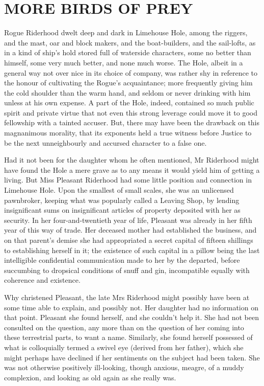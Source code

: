 
\chapter{MORE BIRDS OF PREY}

Rogue Riderhood dwelt deep and dark in Limehouse Hole, among the
riggers, and the mast, oar and block makers, and the boat-builders, and
the sail-lofts, as in a kind of ship’s hold stored full of waterside
characters, some no better than himself, some very much better, and
none much worse. The Hole, albeit in a general way not over nice in
its choice of company, was rather shy in reference to the honour of
cultivating the Rogue’s acquaintance; more frequently giving him the
cold shoulder than the warm hand, and seldom or never drinking with him
unless at his own expense. A part of the Hole, indeed, contained so
much public spirit and private virtue that not even this strong leverage
could move it to good fellowship with a tainted accuser. But, there may
have been the drawback on this magnanimous morality, that its exponents
held a true witness before Justice to be the next unneighbourly and
accursed character to a false one.

Had it not been for the daughter whom he often mentioned, Mr Riderhood
might have found the Hole a mere grave as to any means it would yield
him of getting a living. But Miss Pleasant Riderhood had some little
position and connection in Limehouse Hole. Upon the smallest of small
scales, she was an unlicensed pawnbroker, keeping what was popularly
called a Leaving Shop, by lending insignificant sums on insignificant
articles of property deposited with her as security. In her
four-and-twentieth year of life, Pleasant was already in her fifth year
of this way of trade. Her deceased mother had established the business,
and on that parent’s demise she had appropriated a secret capital of
fifteen shillings to establishing herself in it; the existence of
such capital in a pillow being the last intelligible confidential
communication made to her by the departed, before succumbing to
dropsical conditions of snuff and gin, incompatible equally with
coherence and existence.

Why christened Pleasant, the late Mrs Riderhood might possibly have
been at some time able to explain, and possibly not. Her daughter had no
information on that point. Pleasant she found herself, and she couldn’t
help it. She had not been consulted on the question, any more than on
the question of her coming into these terrestrial parts, to want a name.
Similarly, she found herself possessed of what is colloquially termed
a swivel eye (derived from her father), which she might perhaps have
declined if her sentiments on the subject had been taken. She was not
otherwise positively ill-looking, though anxious, meagre, of a muddy
complexion, and looking as old again as she really was.

